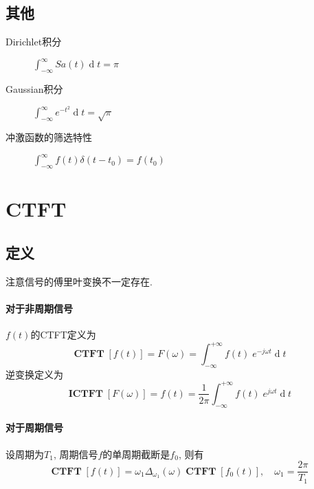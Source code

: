 \documentclass{ctexart}
\DeclareMathOperator{\CTFT}{\mathbf{CTFT}}
\DeclareMathOperator{\ICTFT}{\mathbf{ICTFT}}
\DeclareMathOperator{\ud}{\mathrm{d}}
\begin{document}
\subsection{其他}
    \begin{description}
        \item[Dirichlet积分] $\int_{-\infty}^{\infty} Sa(t) \ud t = \pi$
        \item[Gaussian积分] $\int_{-\infty}^{\infty} e^{-t^2} \ud t = \sqrt{\pi}$
        \item[冲激函数的筛选特性] $\int_{-\infty}^{\infty} f(t) \delta(t - t_0) = f(t_0)$
    \end{description}


\section{CTFT}
\subsection{定义}
注意信号的傅里叶变换不一定存在.
\paragraph{对于非周期信号} $f(t)$的CTFT定义为 \[
    \CTFT[f(t)] = F(\omega) = \int_{-\infty}^{+\infty} f(t)\; e^{-j \omega t} \ud t \]
    逆变换定义为 \[
    \ICTFT[F(\omega)] = f(t) = \frac{1}{2\pi} \int_{-\infty}^{+\infty} f(t)\; e^{j \omega t} \ud t \]

\paragraph{对于周期信号}
    设周期为$T_1$, 周期信号$f$的单周期截断是$f_0$, 则有 \[
        \CTFT[ f(t) ] = \omega_1 \Delta_{\omega_1}(\omega) \CTFT[ f_0(t) ] ,\quad \omega_1 = \frac{2\pi}{T_1}  \]
\end{document}
